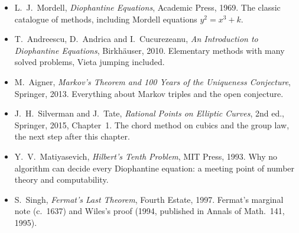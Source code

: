\begin{itemize}
\item L.~J.~Mordell, \emph{Diophantine Equations}, Academic Press, 1969. The classic catalogue of methods, including Mordell equations $y^2=x^3+k$.
\item T.~Andreescu, D.~Andrica and I.~Cucurezeanu, \emph{An Introduction to Diophantine Equations}, Birkh\"auser, 2010. Elementary methods with many solved problems, Vieta jumping included.
\item M.~Aigner, \emph{Markov's Theorem and 100 Years of the Uniqueness Conjecture}, Springer, 2013. Everything about Markov triples and the open conjecture.
\item J.~H.~Silverman and J.~Tate, \emph{Rational Points on Elliptic Curves}, 2nd ed., Springer, 2015, Chapter~1. The chord method on cubics and the group law, the next step after this chapter.
\item Y.~V.~Matiyasevich, \emph{Hilbert's Tenth Problem}, MIT Press, 1993. Why no algorithm can decide every Diophantine equation: a meeting point of number theory and computability.
\item S.~Singh, \emph{Fermat's Last Theorem}, Fourth Estate, 1997. Fermat's marginal note (c.~1637) and Wiles's proof (1994, published in Annals of Math.\ 141, 1995).
\end{itemize}
